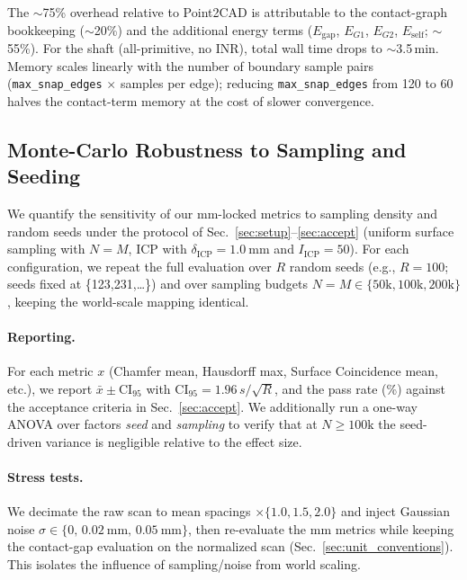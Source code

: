 \documentclass{ieeeaccess}
\begin{document}
The $\sim$75\% overhead relative to Point2CAD is attributable to the
contact-graph bookkeeping ($\sim$20\%) and the additional energy terms
($E_{\text{gap}}$, $E_{G1}$, $E_{G2}$, $E_{\text{self}}$; $\sim$55\%).
For the shaft (all-primitive, no INR), total wall time drops to
$\sim$3.5\,min.
Memory scales linearly with the number of boundary sample pairs
(\texttt{max\_snap\_edges}$\,{\times}\,$samples per edge); reducing
\texttt{max\_snap\_edges} from 120 to 60 halves the contact-term memory
at the cost of slower convergence.

\subsection{Monte-Carlo Robustness to Sampling and Seeding}
\label{sec:robustness}
We quantify the sensitivity of our mm-locked metrics to sampling density and random seeds
under the protocol of Sec.~\ref{sec:setup}--\ref{sec:accept} (uniform surface sampling with $N{=}M$,
ICP with $\delta_{\mathrm{ICP}}{=}\SI{1.0}{\milli\meter}$ and $I_{\mathrm{ICP}}{=}50$). %
For each configuration, we repeat the full evaluation over $R$ random seeds 
(e.g., $R{=}100$; seeds fixed at \{123,231,\dots\}) and over sampling budgets 
$N{=}M \in \{50\mathrm{k}, 100\mathrm{k}, 200\mathrm{k}\}$, keeping the world-scale mapping identical.

\paragraph*{Reporting.}
For each metric $x$ (Chamfer mean, Hausdorff max, Surface Coincidence mean, etc.), 
we report $\bar x \pm \mathrm{CI}_{95}$ with 
$\mathrm{CI}_{95} = 1.96\, s / \sqrt{R}$, and the pass rate (\%) against the acceptance criteria 
in Sec.~\ref{sec:accept}. We additionally run a one-way ANOVA over factors 
\textit{seed} and \textit{sampling} to verify that at $N{\ge}100\mathrm{k}$ the seed-driven variance 
is negligible relative to the effect size.

\paragraph*{Stress tests.}
We decimate the raw scan to mean spacings $\times\{1.0, 1.5, 2.0\}$ and inject 
Gaussian noise $\sigma \in \{0,\,\SI{0.02}{\milli\meter},\,\SI{0.05}{\milli\meter}\}$, 
then re-evaluate the mm metrics while keeping the contact-gap evaluation on the normalized scan 
(Sec.~\ref{sec:unit_conventions}). This isolates the influence of sampling/noise from world scaling.
\end{document}
